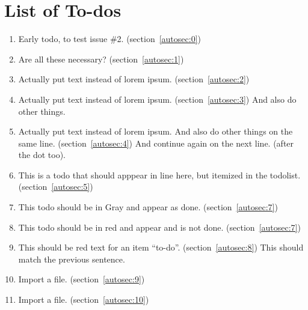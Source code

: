 \section{List of To-dos}
    \begin{enumerate}[noitemsep]
        \item {\color{red}Early todo, to test issue \#2.} (section~\ref{autosec:0})
        \item {\color{ForestGreen}Are all these necessary?} (section~\ref{autosec:1})
        \item {\color{red}Actually put text instead of lorem ipsum.} (section~\ref{autosec:2})
        \item {\color{red}Actually put text instead of lorem ipsum.} (section~\ref{autosec:3})
{\color{red}And also do other things.}
        \item {\color{red}Actually put text instead of lorem ipsum. And also do other things on the same line.} (section~\ref{autosec:4})
{\color{red}And continue again on the next line. (after the dot too).}
        \item {\color{red}This is a todo that should apppear in line here, but itemized in the todolist.} (section~\ref{autosec:5})
        \item {\color{Gray}This todo should be in Gray and appear as done.} (section~\ref{autosec:7})
        \item {\color{red}This todo should be in red and appear and is not done.} (section~\ref{autosec:7})
        \item {\color{red}This should be red text for an item ``to-do''.} (section~\ref{autosec:8})
{\color{red}This should match the previous sentence.}
        \item {\color{red}Import a file.} (section~\ref{autosec:9})
        \item {\color{red}Import a file.} (section~\ref{autosec:10})
    \end{enumerate}

